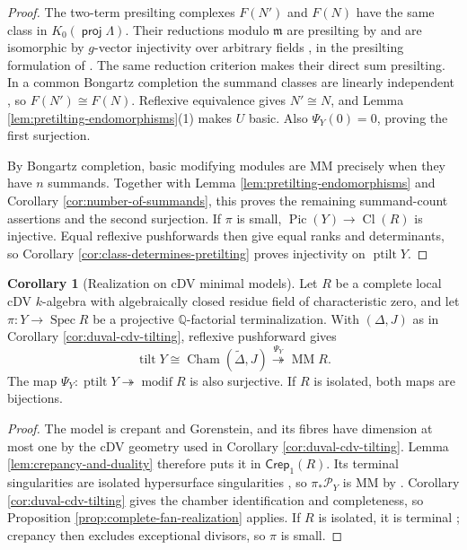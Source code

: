 \documentclass[a4paper,reqno]{amsart}
\def\P{\mathcal{P}}
\def\m{\mathfrak{m}}
\DeclareMathOperator{\proj}{\mathsf{proj}}
\DeclareMathOperator{\Cl}{Cl}
\DeclareMathOperator{\Spec}{Spec}
\DeclareMathOperator{\Pic}{Pic}
\DeclareMathOperator{\tilt}{tilt}
\DeclareMathOperator{\ptilt}{ptilt}
\DeclareMathOperator{\modif}{modif}
\DeclareMathOperator{\MM}{MM}
\theoremstyle{definition}
\newtheorem{Cor}[Thm]{Corollary}
\begin{document}
\begin{proof}
The two-term presilting complexes $F(N')$ and $F(N)$ have the same class in $K_0(\proj\Lambda)$. Their reductions modulo $\m$ are presilting by \cite[Proposition 4.2(a)]{Kim24} and are isomorphic by $g$-vector injectivity over arbitrary fields \cite[Theorem 6.5(a)]{DIJ19}, in the presilting formulation of \cite[Proposition 3.9(1)]{Asa21}. The same reduction criterion makes their direct sum presilting. In a common Bongartz completion the summand classes are linearly independent \cite[Theorem 2.27]{AI}, so $F(N')\cong F(N)$. Reflexive equivalence gives $N'\cong N$, and Lemma \ref{lem:pretilting-endomorphisms}(1) makes $U$ basic. Also $\Psi_Y(0)=0$, proving the first surjection.

By Bongartz completion, basic modifying modules are MM precisely when they have $n$ summands. Together with Lemma \ref{lem:pretilting-endomorphisms} and Corollary \ref{cor:number-of-summands}, this proves the remaining summand-count assertions and the second surjection. If $\pi$ is small, $\Pic(Y)\to\Cl(R)$ is injective. Equal reflexive pushforwards then give equal ranks and determinants, so Corollary \ref{cor:class-determines-pretilting} proves injectivity on $\ptilt Y$.
\end{proof}

\begin{Cor}[Realization on cDV minimal models]\label{cor:cdv-modifying-realization}
Let $R$ be a complete local cDV $k$-algebra with algebraically closed residue field of characteristic zero, and let $\pi\colon Y\to\Spec R$ be a projective $\mathbb Q$-factorial terminalization. With $(\Delta,J)$ as in Corollary \ref{cor:duval-cdv-tilting}, reflexive pushforward gives
\begin{equation}\label{eq:cdv-chamber-realization}
\tilt Y\cong\operatorname{Cham}(\widetilde\Delta,J)
\overset{\Psi_Y}{\twoheadrightarrow}\MM R.
\end{equation}
The map $\Psi_Y\colon\ptilt Y\twoheadrightarrow\modif R$ is also surjective. If $R$ is isolated, both maps are bijections.
\end{Cor}
\begin{proof}
The model is crepant and Gorenstein, and its fibres have dimension at most one by the cDV geometry used in Corollary \ref{cor:duval-cdv-tilting}. Lemma \ref{lem:crepancy-and-duality} therefore puts it in $\mathsf{Crep}_1(R)$. Its terminal singularities are isolated hypersurface singularities \cite[Remark 4.17]{IW14}, so $\pi_*\P_Y$ is MM by \cite[Corollary 4.19]{IW14}. Corollary \ref{cor:duval-cdv-tilting} gives the chamber identification and completeness, so Proposition \ref{prop:complete-fan-realization} applies. If $R$ is isolated, it is terminal \cite[Theorem 1.1]{Rei83}; crepancy then excludes exceptional divisors, so $\pi$ is small.
\end{proof}
\end{document}
